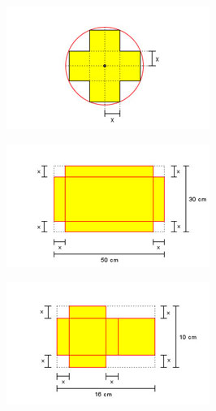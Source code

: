 \begin{figure}
    \begin{subfigure}{0.3\textwidth}
    \centering
    \includegraphics[width=.9\textwidth]{icones-modulos/pot-m-pbo.jpg}
    \label{fig:pbo-ic}
    \end{subfigure}
    \hfill
    \begin{subfigure}{0.3\textwidth}
    \centering
    \includegraphics[width=.9\textwidth]{icones-modulos/pot-m-pdc.jpg}
    \label{fig:pdc-ic}
    \end{subfigure}
    \hfill
    \begin{subfigure}{0.3\textwidth}
    \centering
    \includegraphics[width=.9\textwidth]{icones-modulos/pot-m-pct.jpg}
    \label{fig:pct-ic}
    \end{subfigure}
    

\end{figure}
